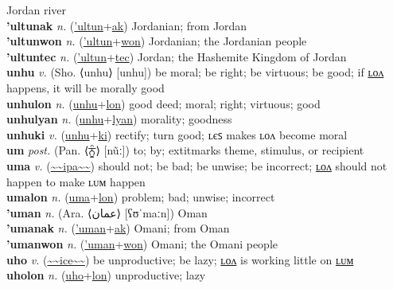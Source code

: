 Jordan river \label{'ultun} \\
\textbf{'ultunak} \textit{n.} (\hyperref['ultun]{'ultun}+\hyperref[ak]{ak})
Jordanian; from Jordan \label{'ultunak} \\
\textbf{'ultunwon} \textit{n.} (\hyperref['ultun]{'ultun}+\hyperref[won]{won})
Jordanian; the Jordanian people \label{'ultunwon} \\
\textbf{'ultuntec} \textit{n.} (\hyperref['ultun]{'ultun}+\hyperref[tec]{tec})
Jordan; the Hashemite Kingdom of Jordan \label{'ultuntec} \\
\textbf{unhu} \textit{v.} (Sho. ⟨unhu⟩ [unhu])
be moral; be right; be virtuous; be good; if \hyperref[unhulon]{ʟᴏᴧ} happens, it will be morally good \label{unhu} \\
\textbf{unhulon} \textit{n.} (\hyperref[unhu]{unhu}+\hyperref[lon]{lon})
good deed; moral; right; virtuous; good \label{unhulon} \\
\textbf{unhulyan} \textit{n.} (\hyperref[unhu]{unhu}+\hyperref[lyan]{lyan})
morality; goodness \label{unhulyan} \\
\textbf{unhuki} \textit{v.} (\hyperref[unhu]{unhu}+\hyperref[ki]{ki})
rectify; turn good; ʟєꜱ makes ʟᴏᴧ become moral \label{unhuki} \\
\textbf{um} \textit{post.} (Pan. ⟨ਨੂੰ⟩ [nũː])
to; by; 	extit{marks theme, stimulus, or recipient} \label{um} \\
\textbf{uma} \textit{v.} (\hyperref[ipa]{\~{}\~{}ipa\~{}\~{}})
should not; be bad; be unwise; be incorrect; \hyperref[umalon]{ʟᴏᴧ} should not happen to make ʟᴜᴍ happen \label{uma} \\
\textbf{umalon} \textit{n.} (\hyperref[uma]{uma}+\hyperref[lon]{lon})
problem; bad; unwise; incorrect \label{umalon} \\
\textbf{'uman} \textit{n.} (Ara. ⟨عمان‎⟩ [ʕʊˈmaːn])
Oman \label{'uman} \\
\textbf{'umanak} \textit{n.} (\hyperref['uman]{'uman}+\hyperref[ak]{ak})
Omani; from Oman \label{'umanak} \\
\textbf{'umanwon} \textit{n.} (\hyperref['uman]{'uman}+\hyperref[won]{won})
Omani; the Omani people \label{'umanwon} \\
\textbf{uho} \textit{v.} (\hyperref[ice]{\~{}\~{}ice\~{}\~{}})
be unproductive; be lazy; \hyperref[uholon]{ʟᴏᴧ} is working little on \hyperref[uholum]{ʟᴜᴍ} \label{uho} \\
\textbf{uholon} \textit{n.} (\hyperref[uho]{uho}+\hyperref[lon]{lon})
unproductive; lazy \label{uholon} \\
